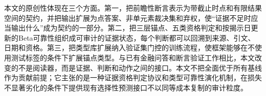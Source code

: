 \documentclass[12pt,openany]{ctexbook}
\begin{document}
{\hspace*{2em}本文的原创性体现在三个方面。第一，把前瞻性断言表示为带截止时点和有限结果空间的契约，并把输出扩展为点答案、非单元素裁决集和弃权，使“证据不足时应当输出什么”成为契约的一部分。第二，把三层锚点、五类资格判定和按揭示日更新的Beta可靠性组织成可审计的证据状态，每个判断都可以回溯到来源、引文、日期和资格。第三，把类型库扩展纳入验证集门控的训练流程，使框架能够在不使用测试标签的条件下扩展锚点类型。与已有金融问答和断言验证工作相比，本文改变的不是阅读器，而是证据、判断和动作之间的接口。本文不把全面优于所有基线作为贡献前提；它主张的是一种证据资格判定协议和类型可靠性演化机制，在损失不显著劣化的条件下提供现有选择性预测接口不以同等成本复制的审计粒度。\par
{}
}
\end{document}
